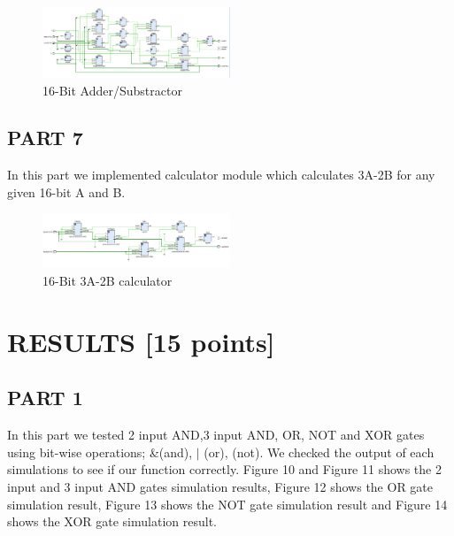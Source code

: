 \documentclass[pdftex,12pt,a4paper]{article}
\begin{document}
\begin{figure}[H]
    \centering
    \includegraphics[width=0.5\textwidth]{adder_substractor_vivadı.png}
    \caption{16-Bit Adder/Substractor}
\end{figure}

\subsection{PART 7}

In this part we implemented calculator module which calculates 3A-2B for any given 16-bit A and B.

\begin{figure}[H]
    \centering
    \includegraphics[width=0.5\textwidth]{part7_verilog.png}
    \caption{16-Bit 3A-2B calculator}
\end{figure}

\section{RESULTS [15 points]}
\subsection{PART 1}
In this part we tested 2 input AND,3 input AND, OR, NOT and XOR gates using bit-wise operations; \&(and), $|$ (or), \texttildelow (not). We checked the output of each simulations to see if our function correctly. Figure 10 and Figure 11 shows the 2 input and 3 input AND gates simulation results, Figure 12 shows the OR gate simulation result, Figure 13 shows the NOT gate simulation result and Figure 14 shows the XOR gate simulation result.
\end{document}
